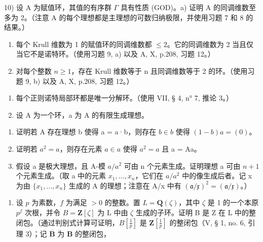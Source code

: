10) 设 A 为赋值环，其值的有序群 \(\Gamma\) 具有性质 (GOD)。a) 证明 A 的同调维数至多为 2。（注意 A 的每个理想都是主理想的可数归纳极限，并使用习题 7 和 8 的结果。）

\begin{enumerate}
\def\labelenumi{\alph{enumi})}
\setcounter{enumi}{1}
\item
  每个 Krull 维数为 1 的赋值环的同调维数都 \(\leqslant 2\)。它的同调维数为 2 当且仅当它不是诺特环。（使用习题 9, a) 以及 A, X, p.208, 习题 12。）
\item
  对每个整数 \(n \geqslant 1\)，存在 Krull 维数等于 n 且同调维数等于 2 的环。（使用习题 9, b) 以及 A, X, p.208, 习题 12。）
\end{enumerate}

\begin{enumerate}
\def\labelenumi{\arabic{enumi})}
\setcounter{enumi}{10}
\item
  每个正则诺特局部环都是唯一分解环。（使用 VII, § 4, n° 7, 推论 3。）
\item
  设 A 为一个环，a 为 A 的有限生成理想。
\end{enumerate}

\begin{enumerate}
\def\labelenumi{\alph{enumi})}
\item
  证明若 A 存在理想 b 使得 a = a·b，则存在 \(b \in b\) 使得 \((1 - b)a = (0)\)。
\item
  证明若 \(a^{2} = a\)，则存在元素 \(a \in a\) 使得 \(a^{2} = a\) 且 a = Aa。
\item
  假设 a 是极大理想，且 A-模 \(a/a^{2}\) 可由 n 个元素生成。证明理想 a 可由 \(n + 1\) 个元素生成。（取 a 中的元素 \(x_{1}, \ldots, x_{n}\)，它们在 \(a/a^{2}\) 中的像生成后者。记 x 为由 \(\{x_{1}, \ldots, x_{n}\}\) 生成的 A 的理想；注意在 A/x 中有 \((\mathfrak{a}/\mathfrak{x})^{2} = (\mathfrak{a}/\mathfrak{x})\)。）
\end{enumerate}

\begin{enumerate}
\def\labelenumi{\arabic{enumi})}
\setcounter{enumi}{12}
\tightlist
\item
  设 \(p\) 为素数，\(f\) 为满足 \(> 0\) 的整数。置 \(L = \mathbf{Q}(\zeta)\)，其中 \(\zeta\) 是 1 的一个本原 \(p^f\) 次根，并令 \(B = \mathbf{Z}[\zeta]\) 为 L 中由 \(\zeta\) 生成的子环。证明 B 是 Z 在 L 中的整闭包。（通过判别式计算可证明，\(B\left[\frac{1}{p}\right]\) 是 \(\mathbf{Z}\left[\frac{1}{p}\right]\) 的整闭包（V, § 1, no. 6, 引理 3）；记 \(\overline{\mathbf{B}}\) 为 \(\mathbf{B}\) 的整闭包，
\end{enumerate}

